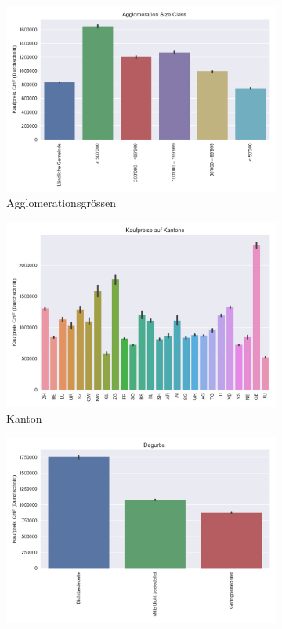 \begin{figure}[h]
\begin{subfigure}{.5\textwidth}
  \centering
  \includegraphics[width=\linewidth]{images/anhang/analysis/barplot_agglomeration_size_class_id.png}
  \caption{Agglomerationsgrössen}
\end{subfigure}
\begin{subfigure}{.5\textwidth}
  \centering
  \includegraphics[width=\linewidth]{images/anhang/analysis/barplot_canton.png}
  \caption{Kanton}
\end{subfigure}
\begin{subfigure}{.5\textwidth}
  \centering
  \includegraphics[width=\linewidth]{images/anhang/analysis/barplot_degurba_id.png}

\end{subfigure}
\end{figure}
